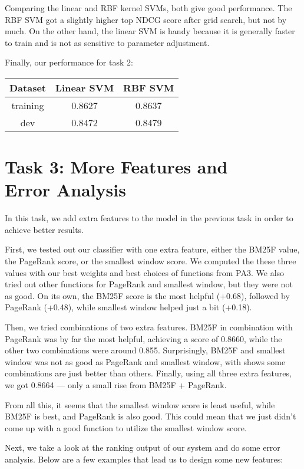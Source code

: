 \documentclass[10pt,twocolumn]{article}
\begin{document}
Comparing the linear and RBF kernel SVMs, both give good performance. The RBF SVM got a slightly higher top NDCG score after grid search, but not by much. On the other hand, the linear SVM is handy because it is generally faster to train and is not as sensitive to parameter adjustment.

Finally, our performance for task 2:
\begin{table}[H]
\centering
\begin{tabular}{|c|c|c|}
\hline
Dataset & Linear SVM & RBF SVM \\\hline
training & 0.8627 & 0.8637 \\\hline
dev & 0.8472 & 0.8479\\\hline
\end{tabular}
\end{table}

\section*{Task 3: More Features and \\Error Analysis}
In this task, we add extra features to the model in the previous task in order to achieve better results.

First, we tested out our classifier with one extra feature, either the BM25F value, the PageRank score, or the smallest window score. We computed the these three values with our best weights and best choices of functions from PA3. We also tried out other functions for PageRank and smallest window, but they were not as good. On its own, the BM25F score is the most helpful (+0.68), followed by PageRank (+0.48), while smallest window helped just a bit (+0.18).

Then, we tried combinations of two extra features. BM25F in combination with PageRank was by far the most helpful, achieving a score of 0.8660, while the other two combinations were around 0.855. Surprisingly, BM25F and smallest window was not as good as PageRank and smallest window, with shows some combinations are just better than others. Finally, using all three extra features, we got 0.8664 --- only a small rise from BM25F + PageRank.

From all this, it seems that the smallest window score is least useful, while BM25F is best, and PageRank is also good. This could mean that we just didn't come up with a good function to utilize the smallest window score.

Next, we take a look at the ranking output of our system and do some error analysis. Below are a few examples that lead us to design some new features:
\end{document}
